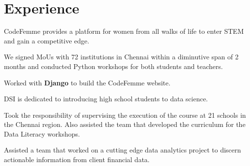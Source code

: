 \documentclass[]{deedy-resume-openfont}
\begin{document}
\begin{minipage}[t]{0.33\textwidth}
{    }
    \sectionsep
    
    
    
    
    
    
    
    \end{minipage} 
    \hfill
    \begin{minipage}[t]{0.66\textwidth} 
    
    
    \section{Experience}
    \vspace{\topsep} %
    \begin{tightemize}
    \item CodeFemme provides a platform for women from all walks of life to enter STEM and gain a competitive edge.
    \item We signed MoUs with 72 institutions in Chennai within a diminutive span of 2 months and  conducted Python workshops for both students and teachers. 
    \item Worked with \textbf{Django} to build the CodeFemme website.
    \end{tightemize}
    \sectionsep
    
    
    \begin{tightemize}
    \item DSI is dedicated to introducing high school students to data science.
    \item Took the responsibility of supervising the execution of the course at 21 schools in the Chennai region. Also assisted the team that developed the  curriculum for the Data Literacy workshops.
    
    
    \end{tightemize}
    \sectionsep
    
    
    \begin{tightemize}
    \item Assisted a team that worked on a cutting edge data analytics project to  discern actionable information from client financial data.
    \end{tightemize}
    \sectionsep
    

\end{minipage}
\end{document}
